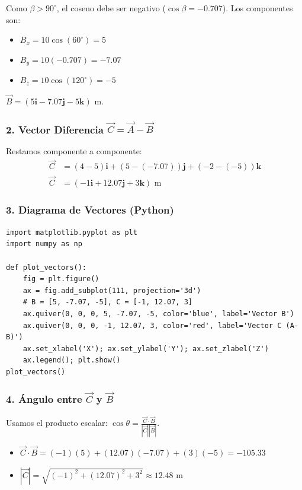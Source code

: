 \documentclass[12pt, a4paper]{article}
\begin{document}
Como $\beta > 90^\circ$, el coseno debe ser negativo ($\cos \beta = -0.707$). Los componentes son:
\begin{itemize}
    \item $B_x = 10 \cos(60^\circ) = 5$
    \item $B_y = 10 (-0.707) = -7.07$
    \item $B_z = 10 \cos(120^\circ) = -5$
\end{itemize}
$\vec{B} = (5\mathbf{i} - 7.07\mathbf{j} - 5\mathbf{k}) \text{ m}$.

\subsubsection*{2. Vector Diferencia $\vec{C} = \vec{A} - \vec{B}$}
Restamos componente a componente:
\begin{align*}
    \vec{C} &= (4 - 5)\mathbf{i} + (5 - (-7.07))\mathbf{j} + (-2 - (-5))\mathbf{k} \\
    \vec{C} &= (-1\mathbf{i} + 12.07\mathbf{j} + 3\mathbf{k}) \text{ m}
\end{align*}

\subsubsection*{3. Diagrama de Vectores (Python)}
\begin{lstlisting}
import matplotlib.pyplot as plt
import numpy as np

def plot_vectors():
    fig = plt.figure()
    ax = fig.add_subplot(111, projection='3d')
    # B = [5, -7.07, -5], C = [-1, 12.07, 3]
    ax.quiver(0, 0, 0, 5, -7.07, -5, color='blue', label='Vector B')
    ax.quiver(0, 0, 0, -1, 12.07, 3, color='red', label='Vector C (A-B)')
    ax.set_xlabel('X'); ax.set_ylabel('Y'); ax.set_zlabel('Z')
    ax.legend(); plt.show()
plot_vectors()
\end{lstlisting}

\subsubsection*{4. Ángulo entre $\vec{C}$ y $\vec{B}$}
Usamos el producto escalar: $\cos \theta = \frac{\vec{C} \cdot \vec{B}}{|\vec{C}| |\vec{B}|}$.
\begin{itemize}
    \item $\vec{C} \cdot \vec{B} = (-1)(5) + (12.07)(-7.07) + (3)(-5) = -105.33$
    \item $|\vec{C}| = \sqrt{(-1)^2 + (12.07)^2 + 3^2} \approx 12.48 \text{ m}$
\end{itemize}
\end{document}
